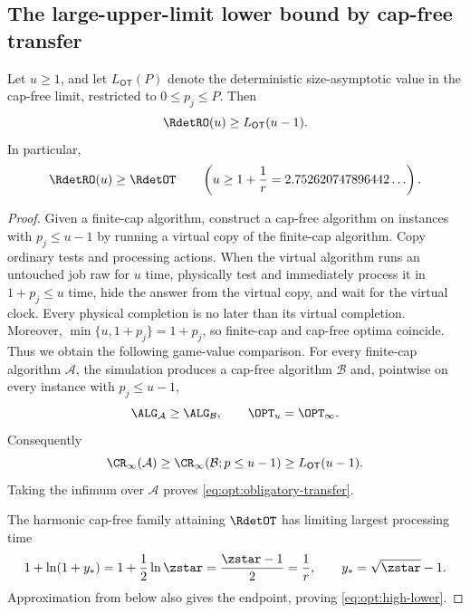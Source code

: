\subsection{The large-upper-limit lower bound by cap-free transfer}

\begin{lemma}
\label{lem:opt:obligatory-transfer}
Let $u\ge1$, and let $L_{\mathsf{OT}}(P)$ denote the deterministic
size-asymptotic value in the cap-free limit, restricted to
$0\le p_j\le P$.  Then
\begin{equation}
 \RdetRO(u)\ge L_{\mathsf{OT}}(u-1).
 \label{eq:opt:obligatory-transfer}
\end{equation}
In particular,
\begin{equation}
 \RdetRO(u)\ge \RdetOT
 \qquad
 \left(u\ge1+\frac1r=2.752620747896442\ldots\right).
 \label{eq:opt:high-lower}
\end{equation}
\end{lemma}

\begin{proof}
Given a finite-cap algorithm, construct a cap-free algorithm on instances
with $p_j\le u-1$ by running a virtual copy of the finite-cap algorithm.  Copy
ordinary tests and processing actions.  When the virtual algorithm runs an
untouched job raw for $u$ time, physically test and immediately process it in
$1+p_j\le u$ time, hide the answer from the virtual copy, and wait for the
virtual clock.  Every physical completion is no later than its virtual
completion.  Moreover, $\min\{u,1+p_j\}=1+p_j$, so finite-cap and cap-free
optima coincide.  Thus we obtain the following game-value comparison.  For
every finite-cap algorithm
$\mathcal A$, the simulation produces a cap-free algorithm $\mathcal B$ and,
pointwise on every instance with $p_j\le u-1$,
\[
 \ALG_{\mathcal A}\ge\ALG_{\mathcal B},
 \qquad \OPT_u=\OPT_\infty.
\]
Consequently
\[
 \CR_\infty(\mathcal A)
 \ge \CR_\infty(\mathcal B; p\le u-1)
 \ge L_{\mathsf{OT}}(u-1).
\]
Taking the infimum over $\mathcal A$ proves
\cref{eq:opt:obligatory-transfer}.

The harmonic cap-free family attaining $\RdetOT$ has limiting largest
processing time
\begin{equation}
 1+\ln(1+y_*)
 =1+\frac12\ln \zstar
 =\frac{\zstar-1}{2}=\frac1r,
 \qquad y_*=\sqrt{\zstar}-1.
\end{equation}
Approximation from below also gives the endpoint, proving
\cref{eq:opt:high-lower}.
\end{proof}

